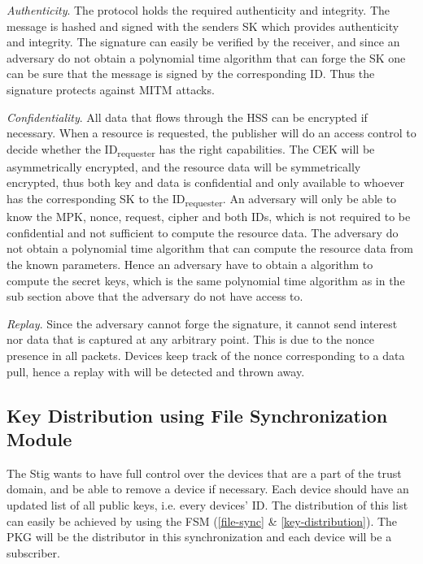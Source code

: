 \textit{Authenticity}.
The protocol holds the required authenticity and integrity. 
The message is hashed and signed with the senders \gls{SK} which provides authenticity and integrity.
The signature can easily be verified by the receiver, and since an adversary do not obtain a polynomial time algorithm that can forge the \gls{SK} one can be sure that the message is signed by the corresponding ID.
Thus the signature protects against \gls{MITM} attacks.

\textit{Confidentiality}. 
All \gls{data} that flows through the \gls{HSS} can be encrypted if necessary. 
When a resource is requested, the \gls{publisher} will do an access control to decide whether the ID\textsubscript{requester} has the right capabilities. 
The \gls{CEK} will be asymmetrically encrypted, and the resource data will be symmetrically encrypted, thus both key and data is confidential and only available to whoever has the corresponding \gls{SK} to the ID\textsubscript{requester}.
An adversary will only be able to know the \gls{MPK}, nonce, request, cipher and both IDs, which is not required to be confidential and not sufficient to compute the resource data. 
The adversary do not obtain a polynomial time algorithm that can compute the resource data from the known parameters.
Hence an adversary have to obtain a algorithm to compute the secret keys, which is the same polynomial time algorithm as in the sub section above that the adversary do not have access to.

\textit{Replay}.
Since the adversary cannot forge the signature, it cannot send \gls{interest} nor \gls{data} that is captured at any arbitrary point. 
This is due to the nonce presence in all packets. 
Devices keep track of the nonce corresponding to a data pull, hence a replay with will be detected and thrown away.

\subsection{Key Distribution using File Synchronization Module}

The Stig wants to have full control over the devices that are a part of the trust domain, and be able to remove a device if necessary.
Each device should have an updated list of all public keys, i.e. every devices' \gls{ID}.
The distribution of this list can easily be achieved by using the \gls{FSM} (\autoref{file-sync} \& \autoref{key-distribution}).
The \gls{PKG} will be the distributor in this synchronization and each device will be a subscriber.


